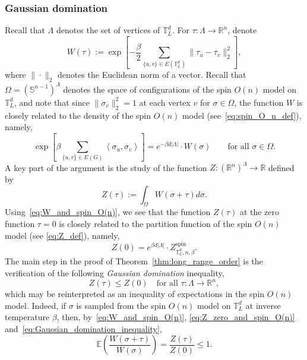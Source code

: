 \documentclass[12pt,reqno]{article}
\def\R{\mathbb{R}}
\def\E{\mathbb{E}}
\def\T{\mathbb{T}}
\renewcommand{\S}{\mathbb{S}}
\begin{document}
\subsubsection{Gaussian domination}
Recall that $\Lambda$ denotes the set of vertices of $\T_L^d$.
For $\tau \colon \Lambda \to \R^n$, denote
\begin{equation}\label{eq:W_def}
W(\tau) := \exp\left[-\frac{\beta}{2}\sum_{\{u,v\}\in E(\T_L^d)}
\|\tau_u - \tau_v\|_2^2\right] ,
\end{equation}
where $\|\cdot\|_2$ denotes the Euclidean norm of a vector.
Recall that $\Omega = \left(\S^{n-1}\right)^\Lambda$ denotes the
space of configurations of the spin $O(n)$ model on $\T_L^d$, and note that since $\|\sigma_v\|_2^2=1$ at each vertex $v$ for $\sigma\in\Omega$, the function $W$ is closely related to the density of the spin $O(n)$ model (see~\eqref{eq:spin_O_n_def}), namely,
\begin{equation}\label{eq:W_and_spin_O(n)}
\exp \left[\beta \sum_{\{u,v\}\in
	E(G)}\left\langle\sigma_u,\sigma_v\right\rangle\right] = e^{-\beta d|\Lambda|}\cdot W(\sigma) \qquad\text{for all }\sigma \in \Omega .
\end{equation}
A key part of the argument is the study of the function
$Z:\left(\R^n\right)^\Lambda\to\R$ defined by
\begin{equation*}
Z(\tau) := \int_\Omega W(\sigma+\tau) d\sigma.
\end{equation*}
Using~\eqref{eq:W_and_spin_O(n)}, we see that the
function $Z(\tau)$ at the zero function $\tau=0$ is closely related to the
partition function of the spin $O(n)$ model (see \eqref{eq:Z_def}), namely,
\begin{equation}\label{eq:Z_zero_and_spin_O(n)}
Z(0) = e^{\beta d|\Lambda|}\cdot Z^{\text{spin}}_{\T_L^d,n,\beta}.
\end{equation}
The main step in the proof of Theorem~\ref{thm:long_range_order} is
the verification of the following \emph{Gaussian domination}
inequality,
\begin{equation}\label{eq:Gaussian_domination_inequality}
Z(\tau) \le Z(0)\quad\text{for all $\tau:\Lambda\to\R^n$},
\end{equation}
which may be reinterpreted as an inequality of expectations in the spin $O(n)$ model. Indeed, if $\sigma$ is sampled from the spin $O(n)$ model on $\T_L^d$ at inverse temperature $\beta$, then, by~\eqref{eq:W_and_spin_O(n)}, \eqref{eq:Z_zero_and_spin_O(n)} and~\eqref{eq:Gaussian_domination_inequality},
\begin{equation}\label{eq:Gaussian_domination_inequality_expectation}
\E\left(\frac{W(\sigma+\tau)}{W(\sigma)}\right) = \frac{Z(\tau)}{Z(0)} \le 1 .
\end{equation}
\end{document}
